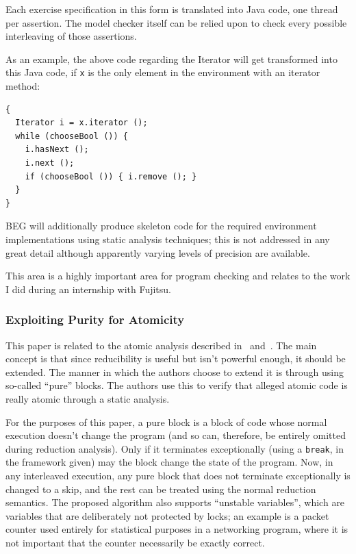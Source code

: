 \documentclass{article}
\begin{document}
\begin{multicols}{2}
Each exercise specification in this form is translated into Java code,
one thread per assertion.  The model checker itself can be relied upon
to check every possible interleaving of those assertions.

As an example, the above code regarding the Iterator will get
transformed into this Java code, if \verb|x| is the only element in
the environment with an iterator method:
\begin{verbatim}
{
  Iterator i = x.iterator ();
  while (chooseBool ()) {
    i.hasNext ();
    i.next ();
    if (chooseBool ()) { i.remove (); }
  }
}
\end{verbatim}

BEG will additionally produce skeleton code for the required
environment implementations using static analysis techniques; this is
not addressed in any great detail although apparently varying levels
of precision are available.

This area is a highly important area for program checking and relates
to the work I did during an internship with Fujitsu.

\subsubsection{Exploiting Purity for Atomicity~\cite{1007543}}

This paper is related to the atomic analysis described
in~\cite{964023} and~\cite{wang03runtimeRV}.  The main concept is that
since reducibility is useful but isn't powerful enough, it should be
extended.  The manner in which the authors choose to extend it is
through using so-called ``pure'' blocks.  The authors use this to
verify that alleged atomic code is really atomic through a static
analysis.

For the purposes of this paper, a pure block is a block of code whose
normal execution doesn't change the program (and so can, therefore, be
entirely omitted during reduction analysis).  Only if it terminates
exceptionally (using a \texttt{break}, in the framework given) may the
block change the state of the program.  Now, in any interleaved
execution, any pure block that does not terminate exceptionally is
changed to a skip, and the rest can be treated using the normal
reduction semantics.  The proposed algorithm also supports ``unstable
variables'', which are variables that are deliberately not protected
by locks; an example is a packet counter used entirely for statistical
purposes in a networking program, where it is not important that the
counter necessarily be exactly correct.


\end{multicols}
\end{document}
